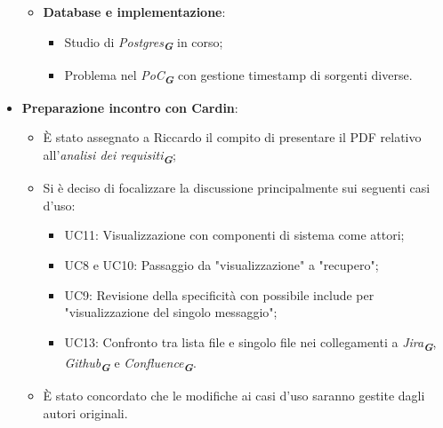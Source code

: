 \begin{itemize}
\begin{itemize}
        \item \textbf{Database e implementazione}:  
        \begin{itemize}
            \item Studio di \emph{Postgres}\textsubscript{\textit{\textbf{G}}} in corso;
            \item Problema nel \emph{PoC}\textsubscript{\textit{\textbf{G}}} con gestione timestamp di sorgenti diverse.  
        \end{itemize}
    \end{itemize}

    \item \textbf{Preparazione incontro con Cardin}:  
    \begin{itemize}
        \item È stato assegnato a Riccardo il compito di presentare il PDF relativo all’\emph{analisi dei requisiti}\textsubscript{\textit{\textbf{G}}};
        \item Si è deciso di focalizzare la discussione principalmente sui seguenti casi d’uso:
        \begin{itemize}
            \item UC11: Visualizzazione con componenti di sistema come attori;
            \item UC8 e UC10: Passaggio da "visualizzazione" a "recupero";
            \item UC9: Revisione della specificità con possibile include per "visualizzazione del singolo messaggio";
            \item UC13: Confronto tra lista file e singolo file nei collegamenti a \emph{Jira}\textsubscript{\textit{\textbf{G}}}, \emph{Github}\textsubscript{\textit{\textbf{G}}} e \emph{Confluence}\textsubscript{\textit{\textbf{G}}}.  
        \end{itemize}
        \item È stato concordato che le modifiche ai casi d’uso saranno gestite dagli autori originali.  
    \end{itemize}


\end{itemize}
